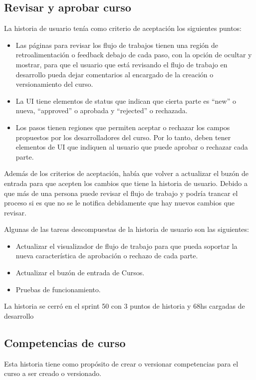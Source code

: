 \subsection{Revisar y aprobar curso}
La historia de usuario tenía como criterio de aceptación los siguientes puntos:
\begin{itemize}
	\item Las páginas para revisar los flujo de trabajos tienen una región de retroalimentación o feedback debajo de cada paso, con la opción de ocultar y mostrar, para que el usuario que está revisando el flujo de trabajo en desarrollo pueda dejar comentarios al encargado de la creación o versionamiento del curso.
	\item La UI tiene elementos de status que indican que cierta parte es “new” o nueva, “approved” o aprobada y “rejected” o rechazada.
	\item Los pasos tienen regiones que permiten aceptar o rechazar los campos propuestos por los desarrolladores del curso. Por lo tanto, deben tener elementos de UI que indiquen al usuario que puede aprobar o rechazar cada parte.
\end{itemize}
Además de los criterios de aceptación, había que volver a actualizar el buzón de entrada para que acepten los cambios que tiene la historia de usuario. Debido a que más de una persona puede revisar el flujo de trabajo y podría trancar el proceso si es que no se le notifica debidamente que hay nuevos cambios que revisar.

Algunas de las tareas descompuestas de la historia de usuario son las siguientes:
\begin{itemize}
	\item Actualizar el visualizador de flujo de trabajo para que pueda soportar la nueva característica de aprobación o rechazo de cada parte.
	\item Actualizar el buzón de entrada de Cursos.
	\item Pruebas de funcionamiento.
\end{itemize}

La historia se cerró en el sprint 50 con 3 puntos de historia y 68hs cargadas de desarrollo

\subsection{Competencias de curso}
Esta historia tiene como propósito de crear o versionar competencias para el curso a ser creado o versionado. 

